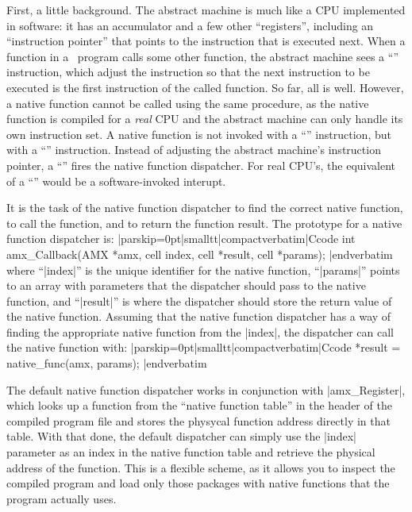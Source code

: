 First, a little background. The abstract machine is much like a CPU
implemented in software: it has an accumulator and a few other ``registers'',
including an ``instruction pointer'' that points to the instruction that is
executed next. When a function in a \Small\ program calls some other function,
the abstract machine sees a ``'' instruction, which adjust the
instruction so that the next instruction to be executed is the first
instruction of the called function. So far, all is well. However, a native
function cannot be called using the same procedure, as the native function is
compiled for a {\it real\/} CPU and the abstract machine can only handle its
own instruction set. A native function is not invoked with a
``'' instruction, but with a ``''
instruction. Instead of adjusting the abstract machine's instruction pointer,
a ``'' fires the native function dispatcher. For real CPU's,
the equivalent of a ``'' would be a software-invoked
interupt.

It is the task of the native function dispatcher to find the correct native
function, to call the function, and to return the function result. The prototype
for a native function dispatcher is:
\verbatim|parskip=0pt|smalltt|compactverbatim|Ccode
    int amx_Callback(AMX *amx, cell index, cell *result, cell *params);
|endverbatim
where ``|index|'' is the unique identifier for the native function, ``|params|''
points to an array with parameters that the dispatcher should pass to the
native function, and ``|result|'' is where the dispatcher should store the
return value of the native function. Assuming that the native function dispatcher
has a way of finding the appropriate native function from the |index|, the
dispatcher can call the native function with:
\verbatim|parskip=0pt|smalltt|compactverbatim|Ccode
    *result = native_func(amx, params);
|endverbatim

The default native function dispatcher works in conjunction with |amx_Register|,
which looks up a function from the ``native function table'' in the header of
the compiled program file and stores the physycal function address directly
in that table. With that done, the default dispatcher can simply use the |index|
parameter as an index in the native function table and retrieve the physical
address of the function. This is a flexible scheme, as it allows you to inspect
the compiled program and load only those packages with native functions that the
program actually uses.

